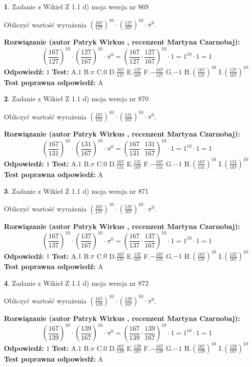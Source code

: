 \documentclass[12pt, a4paper]{article}
\theoremstyle{definition} %
\newtheorem{zad}{}
\newcommand{\zadStart}[1]{\begin{zad}#1\newline}
\newcommand{\zadStop}{\end{zad}}
\newcommand{\rozwStart}[2]{\noindent \textbf{Rozwiązanie (autor #1 , recenzent #2): }\newline}
\newcommand{\rozwStop}{\newline}
\newcommand{\odpStart}{\noindent \textbf{Odpowiedź:}\newline}
\newcommand{\odpStop}{\newline}
\newcommand{\testStart}{\noindent \textbf{Test:}\newline}
\newcommand{\testStop}{\newline}
\newcommand{\kluczStart}{\noindent \textbf{Test poprawna odpowiedź:}\newline}
\newcommand{\kluczStop}{\newline}
\begin{document}
\zadStart{Zadanie z Wikieł Z 1.1 d) moja wersja nr 869}

Obliczyć wartość wyrażenia $(\frac{167}{127})^{10} \cdot (\frac{127}{167})^{10} \cdot \pi^{0}$.
\zadStop
\rozwStart{Patryk Wirkus}{Martyna Czarnobaj}
$$(\frac{167}{127})^{10} \cdot (\frac{127}{167})^{10} \cdot \pi^{0} = (\frac{167}{127} \cdot \frac{127}{167})^{10} \cdot 1 = 1^{10} \cdot 1 = 1$$
\rozwStop
\odpStart
$1$
\odpStop
\testStart
A.$1$ B.$\pi$ C.$0$ D.$\frac{167}{127}$ E.$\frac{127}{167}$
F.$-\frac{167}{127}$ G.$-1$
H.$(\frac{167}{127})^{10}$
I.$(\frac{127}{167})^{10}$
\testStop
\kluczStart
A
\kluczStop



\zadStart{Zadanie z Wikieł Z 1.1 d) moja wersja nr 870}

Obliczyć wartość wyrażenia $(\frac{167}{131})^{10} \cdot (\frac{131}{167})^{10} \cdot \pi^{0}$.
\zadStop
\rozwStart{Patryk Wirkus}{Martyna Czarnobaj}
$$(\frac{167}{131})^{10} \cdot (\frac{131}{167})^{10} \cdot \pi^{0} = (\frac{167}{131} \cdot \frac{131}{167})^{10} \cdot 1 = 1^{10} \cdot 1 = 1$$
\rozwStop
\odpStart
$1$
\odpStop
\testStart
A.$1$ B.$\pi$ C.$0$ D.$\frac{167}{131}$ E.$\frac{131}{167}$
F.$-\frac{167}{131}$ G.$-1$
H.$(\frac{167}{131})^{10}$
I.$(\frac{131}{167})^{10}$
\testStop
\kluczStart
A
\kluczStop



\zadStart{Zadanie z Wikieł Z 1.1 d) moja wersja nr 871}

Obliczyć wartość wyrażenia $(\frac{167}{137})^{10} \cdot (\frac{137}{167})^{10} \cdot \pi^{0}$.
\zadStop
\rozwStart{Patryk Wirkus}{Martyna Czarnobaj}
$$(\frac{167}{137})^{10} \cdot (\frac{137}{167})^{10} \cdot \pi^{0} = (\frac{167}{137} \cdot \frac{137}{167})^{10} \cdot 1 = 1^{10} \cdot 1 = 1$$
\rozwStop
\odpStart
$1$
\odpStop
\testStart
A.$1$ B.$\pi$ C.$0$ D.$\frac{167}{137}$ E.$\frac{137}{167}$
F.$-\frac{167}{137}$ G.$-1$
H.$(\frac{167}{137})^{10}$
I.$(\frac{137}{167})^{10}$
\testStop
\kluczStart
A
\kluczStop



\zadStart{Zadanie z Wikieł Z 1.1 d) moja wersja nr 872}

Obliczyć wartość wyrażenia $(\frac{167}{139})^{10} \cdot (\frac{139}{167})^{10} \cdot \pi^{0}$.
\zadStop
\rozwStart{Patryk Wirkus}{Martyna Czarnobaj}
$$(\frac{167}{139})^{10} \cdot (\frac{139}{167})^{10} \cdot \pi^{0} = (\frac{167}{139} \cdot \frac{139}{167})^{10} \cdot 1 = 1^{10} \cdot 1 = 1$$
\rozwStop
\odpStart
$1$
\odpStop
\testStart
A.$1$ B.$\pi$ C.$0$ D.$\frac{167}{139}$ E.$\frac{139}{167}$
F.$-\frac{167}{139}$ G.$-1$
H.$(\frac{167}{139})^{10}$
I.$(\frac{139}{167})^{10}$
\testStop
\kluczStart
A
\kluczStop
\end{document}
